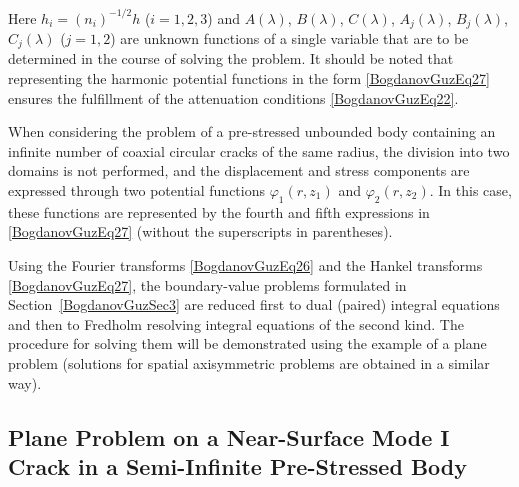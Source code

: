%
Here $h_{i}=(n_{i})^{-1/2}h$ ($i=1,2,3$) and $A(\lambda)$, $B(\lambda)$, $C(\lambda)$, $A_{j}(\lambda)$, $B_{j}(\lambda)$, $C_{j}(\lambda)$ ($j=1,2$) are unknown functions of a single variable that are to be determined in the course of solving the problem. It should be noted that representing the harmonic potential functions in the form \eqref{BogdanovGuzEq27} ensures the fulfillment of the attenuation conditions \eqref{BogdanovGuzEq22}. 

When considering the problem of a pre-stressed unbounded body containing an infinite number of coaxial circular cracks of the same radius, the division into two domains is not performed, and the displacement and stress components are expressed through two potential functions $\varphi_{1}(r,z_{1})$ and $\varphi_{2}(r,z_{2})$. In this case, these functions are represented by the fourth and fifth expressions in \eqref{BogdanovGuzEq27} (without the superscripts in parentheses).

Using the Fourier transforms \eqref{BogdanovGuzEq26} and the Hankel transforms \eqref{BogdanovGuzEq27}, the boundary-value problems formulated in Section~\ref{BogdanovGuzSec3} are reduced first to dual (paired) integral equations and then to Fredholm resolving integral equations of the second kind. The procedure for solving them will be demonstrated using the example of a plane problem (solutions for spatial axisymmetric problems are obtained in a similar way).


\subsection{Plane Problem on a Near-Surface Mode I Crack in a Semi-Infinite Pre-Stressed Body}

